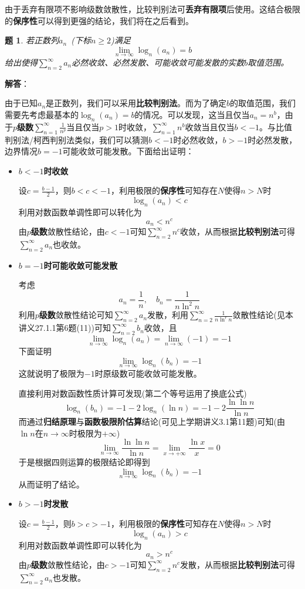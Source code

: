 \documentclass[a4paper,UTF8,fontset=windows,AutoFakeBold]{ctexart}
\newcommand*{\suminf}[1][n=1]{\sum_{#1}^\infty}
\newcommand*{\note}{\noindent *}
\theoremstyle{ex}
\newtheorem{exercise}{题}
\newcommand{\sol}[1]{{\vspace{5pt}\kaishu\noindent\textbf{解答}：\vspace{-3pt}
\begin{compactitem}
    \item[] #1
\end{compactitem}
}}
\begin{document}
\note 由于丢弃有限项不影响级数敛散性，比较判别法可\textbf{丢弃有限项}后使用。这结合极限的\textbf{保序性}可以得到更强的结论，我们将在之后看到。

\begin{framed}
\begin{exercise}
    若正数列$a_n$\ (下标$n\ge2$)满足
    $$\lim_{n\to\infty}\log_n(a_n)=b$$
    给出使得$\suminf[n=2]a_n$必然收敛、必然发散、可能收敛可能发散的实数$b$取值范围。
\end{exercise}
\sol{
    由于已知$a_n$是正数列，我们可以采用\textbf{比较判别法}。而为了确定$b$的取值范围，我们需要先考虑最基本的$\log_n(a_n)=b$的情况。可以发现，这当且仅当$a_n=n^b$，由于\textbf{$p$级数}$\suminf\frac{1}{n^p}$当且仅当$p>1$时收敛，$\suminf n^b$收敛当且仅当$b<-1$。与比值判别法/柯西判别法类似，我们可以猜测$b<-1$时必然收敛，$b>-1$时必然发散，边界情况$b=-1$可能收敛可能发散。下面给出证明：
    \begin{itemize}
        \item $b<-1$\textbf{时收敛}
        
        设$c=\frac{b-1}{2}$，则$b<c<-1$，利用极限的\textbf{保序性}可知存在$N$使得$n>N$时
        $$\log_n(a_n)<c$$
        利用对数函数单调性即可以转化为
        $$a_n<n^c$$
        由\textbf{$p$级数}敛散性结论，由$c<-1$可知$\suminf[n=2]n^c$收敛，从而根据\textbf{比较判别法}可得$\suminf[n=2]a_n$也收敛。


        \item $b=-1$\textbf{时可能收敛可能发散}
        
        考虑
        $$a_n=\frac{1}{n},\quad b_n=\frac{1}{n\ln^2n}$$
        利用\textbf{$p$级数}敛散性结论可知$\suminf[n=2]a_n$发散，利用$\suminf[n=2]\frac{1}{n\ln^rn}$敛散性结论(见本讲义27.1.1第6题(11))可知$\suminf[n=2]b_n$收敛，且
        $$\lim_{n\to\infty}\log_n(a_n)=\lim_{n\to\infty}(-1)=-1$$
        下面证明
        $$\lim_{n\to\infty}\log_n(b_n)=-1$$
        这就说明了极限为$-1$时原级数可能收敛可能发散。

        直接利用对数函数性质计算可发现(第二个等号运用了换底公式)
        $$\log_n(b_n)=-1-2\log_n(\ln n)=-1-2\frac{\ln\ln n}{\ln n}$$
        而通过\textbf{归结原理}与\textbf{函数极限阶估算}结论(可见上学期讲义3.1第11题)可知(由$\ln n$在$n\to\infty$时极限为$+\infty$)
        $$\lim_{n\to\infty}\frac{\ln\ln n}{\ln n}=\lim_{x\to+\infty}\frac{\ln x}{x}=0$$
        于是根据四则运算的极限结论即得到
        $$\lim_{n\to\infty}\log_n(b_n)=-1$$
        从而证明了结论。
        
        \item $b>-1$\textbf{时发散}
        
        设$c=\frac{b-1}{2}$，则$b>c>-1$，利用极限的\textbf{保序性}可知存在$N$使得$n>N$时
        $$\log_n(a_n)>c$$
        利用对数函数单调性即可以转化为
        $$a_n>n^c$$
        由\textbf{$p$级数}敛散性结论，由$c>-1$可知$\suminf[n=2]n^c$发散，从而根据\textbf{比较判别法}可得$\suminf[n=2]a_n$也发散。
    \end{itemize}
}
\end{framed}
\end{document}
